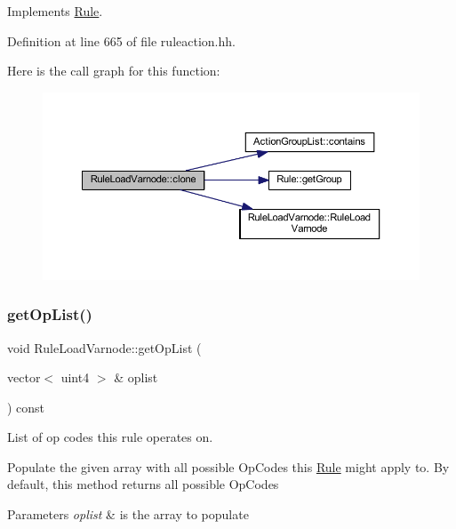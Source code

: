Implements \mbox{\hyperlink{class_rule_a70de90a76461bfa7ea0b575ce3c11e4d}{Rule}}.



Definition at line 665 of file ruleaction.\+hh.

Here is the call graph for this function\+:
\nopagebreak
\begin{figure}[H]
\begin{center}
\leavevmode
\includegraphics[width=350pt]{class_rule_load_varnode_a7f29e5dd4a43fa70e6cc1bf882b4e807_cgraph}
\end{center}
\end{figure}
\mbox{\label{class_rule_load_varnode_ae9ad3245a63ae138d3b6de56221ec111}} 
\subsubsection{\texorpdfstring{getOpList()}{getOpList()}}
{\footnotesize\ttfamily void Rule\+Load\+Varnode\+::get\+Op\+List (\begin{DoxyParamCaption}\item[{vector$<$ uint4 $>$ \&}]{oplist }\end{DoxyParamCaption}) const\hspace{0.3cm}{\ttfamily [virtual]}}



List of op codes this rule operates on. 

Populate the given array with all possible Op\+Codes this \mbox{\hyperlink{class_rule}{Rule}} might apply to. By default, this method returns all possible Op\+Codes 
\begin{DoxyParams}{Parameters}
{\em oplist} & is the array to populate \\
\hline
\end{DoxyParams}


